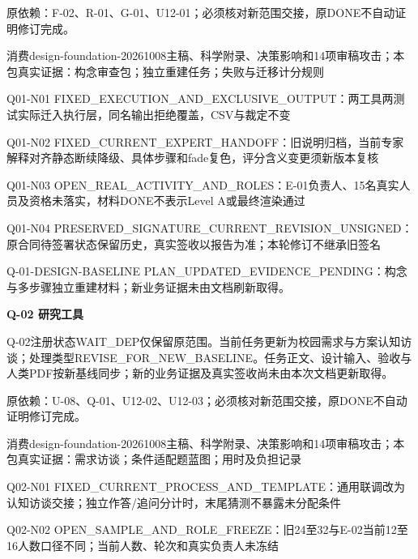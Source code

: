 \documentclass[11pt,a4paper]{article}
\newcommand{\reviewsection}[1]{\par\Needspace{5\baselineskip}\vspace{10pt}\begin{center}{\titlelatin\titlecjk\bfseries\fontsize{14}{20}\selectfont #1}\end{center}}
\begin{document}
原依赖：F-\allowbreak{}02、R-\allowbreak{}01、G-\allowbreak{}01、U12-\allowbreak{}01；必须核对新范围交接，原DONE不自动证明修订完成。


消费design-\allowbreak{}foundation-\allowbreak{}20261008主稿、科学附录、决策影响和14项审稿攻击；本包真实证据：构念审查包；独立重建任务；失败与迁移计分规则


Q01-\allowbreak{}N01 FIXED\_\allowbreak{}EXECUTION\_\allowbreak{}AND\_\allowbreak{}EXCLUSIVE\_\allowbreak{}OUTPUT：两工具两测试实际迁入执行层，同名输出拒绝覆盖，CSV与裁定不变


Q01-\allowbreak{}N02 FIXED\_\allowbreak{}CURRENT\_\allowbreak{}EXPERT\_\allowbreak{}HANDOFF：旧说明归档，当前专家解释对齐静态断续降级、具体步骤和fade复色，评分含义变更须新版本复核


Q01-\allowbreak{}N03 OPEN\_\allowbreak{}REAL\_\allowbreak{}ACTIVITY\_\allowbreak{}AND\_\allowbreak{}ROLES：E-\allowbreak{}01负责人、15名真实人员及资格未落实，材料DONE不表示Level A或最终渲染通过


Q01-\allowbreak{}N04 PRESERVED\_\allowbreak{}SIGNATURE\_\allowbreak{}CURRENT\_\allowbreak{}REVISION\_\allowbreak{}UNSIGNED：原合同待签署状态保留历史，真实签收以报告为准；本轮修订不继承旧签名


Q-\allowbreak{}01-\allowbreak{}DESIGN-\allowbreak{}BASELINE PLAN\_\allowbreak{}UPDATED\_\allowbreak{}EVIDENCE\_\allowbreak{}PENDING：构念与多步骤独立重建材料；新业务证据未由文档刷新取得。


\reviewsection{Q-\allowbreak{}02 研究工具}
Q-\allowbreak{}02注册状态WAIT\_\allowbreak{}DEP仅保留原范围。当前任务更新为校园需求与方案认知访谈；处理类型REVISE\_\allowbreak{}FOR\_\allowbreak{}NEW\_\allowbreak{}BASELINE。任务正文、设计输入、验收与人类PDF按新基线同步；新的业务证据及真实签收尚未由本次文档更新取得。


原依赖：U-\allowbreak{}08、Q-\allowbreak{}01、U12-\allowbreak{}02、U12-\allowbreak{}03；必须核对新范围交接，原DONE不自动证明修订完成。


消费design-\allowbreak{}foundation-\allowbreak{}20261008主稿、科学附录、决策影响和14项审稿攻击；本包真实证据：需求访谈；条件适配题蓝图；用时及负担记录


Q02-\allowbreak{}N01 FIXED\_\allowbreak{}CURRENT\_\allowbreak{}PROCESS\_\allowbreak{}AND\_\allowbreak{}TEMPLATE：通用联调改为认知访谈交接；独立作答/\allowbreak{}追问分计时，末尾猜测不暴露未分配条件


Q02-\allowbreak{}N02 OPEN\_\allowbreak{}SAMPLE\_\allowbreak{}AND\_\allowbreak{}ROLE\_\allowbreak{}FREEZE：旧24至32与E-\allowbreak{}02当前12至16人数口径不同；当前人数、轮次和真实负责人未冻结
\end{document}

